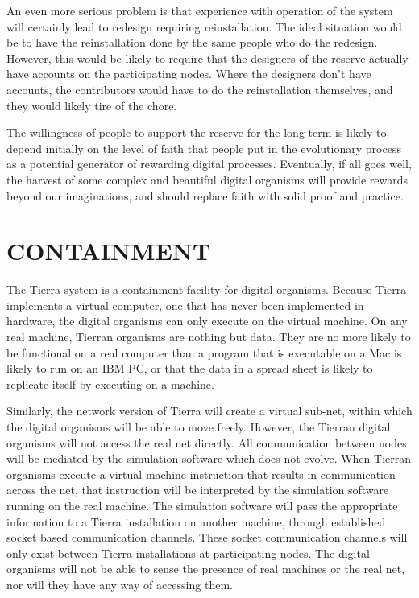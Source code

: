 An even more serious problem is that experience with operation of the
system will certainly lead to redesign requiring reinstallation.  The
ideal situation would be to have the reinstallation done by the same
people who do the redesign.  However, this would be likely to require
that the designers of the reserve actually have accounts on the
participating nodes.  Where the designers don't have accounts, the
contributors would have to do the reinstallation themselves, and they
would likely tire of the chore.

The willingness of people to support the reserve for the long term
is likely to depend initially on the level of faith that people put
in the evolutionary process as a potential generator of rewarding
digital processes.  Eventually, if all goes well, the harvest of
some complex and beautiful digital organisms will provide rewards
beyond our imaginations, and should replace faith with solid proof
and practice.

\section{\bf CONTAINMENT}

The Tierra system is a containment facility for digital organisms.
Because Tierra implements a virtual computer, one that has never been
implemented in hardware, the digital organisms can only execute on the
virtual machine.  On any real machine, Tierran organisms are nothing but
data.  They are no more likely to be functional on a real computer than
a program that is executable on a Mac is likely to run on an IBM PC, or that
the data in a spread sheet is likely to replicate itself by executing on
a machine.

Similarly, the network version of Tierra will create a virtual sub-net,
within which the digital organisms will be able to move freely.  However,
the Tierran digital organisms will not access the real net directly.
All communication between nodes will be mediated by the simulation software
which does not evolve.  When Tierran organisms execute a virtual machine
instruction that results in communication across the net, that instruction
will be interpreted by the simulation software running on the real machine.
The simulation software will pass the appropriate information to a
Tierra installation on another machine, through established socket based
communication channels.  These socket communication channels will only
exist between Tierra installations at participating nodes.  The digital
organisms will not be able to sense the presence of real machines or
the real net, nor will they have any way of accessing them.


